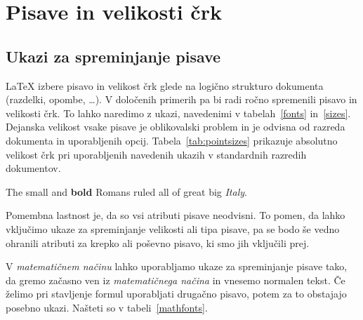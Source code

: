 \section{Pisave in velikosti črk}

\subsection{Ukazi za spreminjanje pisave}
 \LaTeX{} izbere pisavo in velikost črk glede na 
logično strukturo dokumenta (razdelki, opombe, \ldots). V določenih primerih pa 
bi radi ročno spremenili pisavo in velikosti črk. To lahko naredimo z ukazi, 
navedenimi v tabelah~\ref{fonts} in~\ref{sizes}. Dejanska velikost vsake pisave
je oblikovalski problem in je odvisna od razreda dokumenta in uporabljenih opcij.
Tabela~\ref{tab:pointsizes} prikazuje absolutno velikost črk pri uporabljenih navedenih ukazih 
v standardnih razredih dokumentov.

\begin{example}
{\small The small and 
\textbf{bold} Romans ruled}
{\Large all of great big 
\textit{Italy}.}
\end{example}

Pomembna lastnost \LaTeXe{} je, da so vsi atributi pisave neodvisni. To pomen, da lahko 
vključimo ukaze za spreminjanje velikosti ali tipa pisave, pa se bodo še vedno ohranili
atributi za krepko ali poševno pisavo, ki smo jih vključili prej.

V \emph{matematičnem načinu} lahko uporabljamo ukaze za spreminjanje pisave tako, da 
gremo začasno ven iz \emph{matematičnega načina} in vnesemo normalen tekst. Če želimo pri
stavljenje formul uporabljati drugačno pisavo, potem za to obstajajo posebno ukazi. Našteti so
v tabeli~\ref{mathfonts}.

